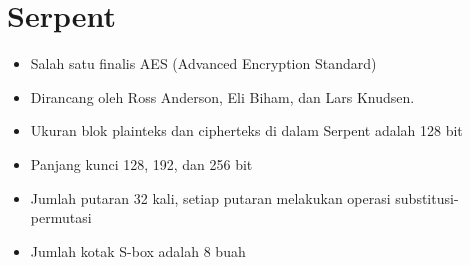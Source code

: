 \documentclass{article}
\begin{document}

\section*{Serpent}

\begin{itemize}
    \item Salah satu finalis AES (Advanced Encryption Standard)
    \item Dirancang oleh Ross Anderson, Eli Biham, dan Lars Knudsen.
    \item Ukuran blok plainteks dan cipherteks di dalam Serpent adalah 128 bit
    \item Panjang kunci 128, 192, dan 256 bit
    \item Jumlah putaran 32 kali, setiap putaran melakukan operasi substitusi-permutasi
    \item Jumlah kotak S-box adalah 8 buah
\end{itemize}
\end{document}
